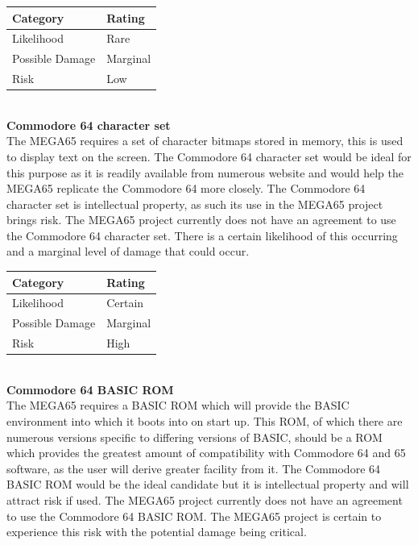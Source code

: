 \begin{tabular}{l|l} %
    	\textbf{Category} 	&	\textbf{Rating} \\
      \hline
     Likelihood			&	Rare \\
     Possible Damage 	& 	Marginal \\
     Risk 				&	Low		\\	
    \end{tabular} \\


\textbf{Commodore 64 character set}\\
The MEGA65 requires a set of character bitmaps stored in memory, this is used to display text on the screen. The Commodore 64 character set would be ideal for this purpose as it is readily available from numerous website and would help the MEGA65 replicate the Commodore 64 more closely. The Commodore 64 character set is intellectual property, as such its use in the MEGA65 project brings risk. The MEGA65 project currently does not have an agreement to use the Commodore 64 character set. There is a certain likelihood of this occurring and a marginal level of damage that could occur. \\

\begin{tabular}{l|l} %
    	\textbf{Category} 	&	\textbf{Rating} \\
      \hline
     Likelihood			&	Certain \\
     Possible Damage 	& 	Marginal \\
     Risk 				&	High		\\	
    \end{tabular} \\


\textbf{Commodore 64 BASIC ROM}\\
The MEGA65 requires a BASIC ROM which will provide the BASIC environment into which it boots into on start up. This ROM, of which there are numerous versions specific to differing versions of BASIC, should be a ROM which provides the greatest amount of compatibility with Commodore 64 and 65 software, as the user will derive greater facility from it. The Commodore 64 BASIC ROM would be the ideal candidate but it is intellectual property and will attract risk if used. The MEGA65 project currently does not have an agreement to use the Commodore 64 BASIC ROM. The MEGA65 project is certain to experience this risk with the potential damage being critical. \\


